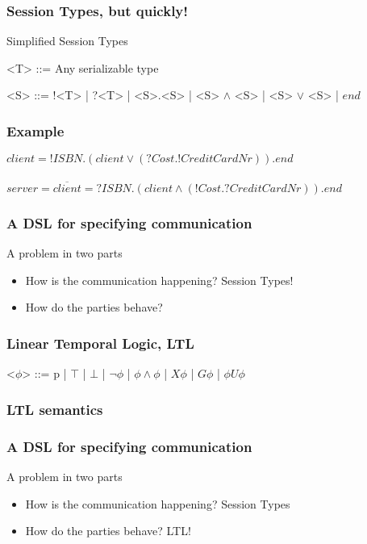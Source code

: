 \documentclass{beamer}
\begin{document}
\begin{frame}[fragile]
    \frametitle{Session Types, but quickly!}
    \large{Simplified Session Types}
    \\
    \begin{grammar}
        <T> ::= Any serializable type

        <S> ::= !<T> | ?<T> | <S>.<S> | <S> $\wedge$ <S> | <S> $\vee$ <S> | $end$
    \end{grammar}
\end{frame}

\begin{frame}[fragile]
    \frametitle{Example}
    \Large{$client = !ISBN.(client \vee (?Cost.!CreditCardNr)).end$}
    \\~\\
    \large{$server = \overline{client} = ?ISBN.(client \wedge (!Cost.?CreditCardNr)).end$}
\end{frame}

\begin{frame}
    \frametitle{A DSL for specifying communication}
    \centering
    \Large{A problem in two parts}
    \begin{itemize}
        \item How is the communication happening? Session Types!
        \item How do the parties behave?
    \end{itemize}
\end{frame}

\begin{frame}[fragile]
    \frametitle{Linear Temporal Logic, LTL}
    \begin{grammar}
        <$\phi$> ::= p | $\top$ | $\bot$ | $\neg$$\phi$ | $\phi\wedge\phi$ | $X\phi$ | $G\phi$ | $\phi U \phi$ 
    \end{grammar}
\end{frame}

\begin{frame}[fragile]
    \frametitle{LTL semantics}
\end{frame}

\begin{frame}
    \frametitle{A DSL for specifying communication}
    \centering
    \Large{A problem in two parts}
    \begin{itemize}
        \item How is the communication happening? Session Types
        \item How do the parties behave? LTL!
    \end{itemize}
\end{frame}
\end{document}
